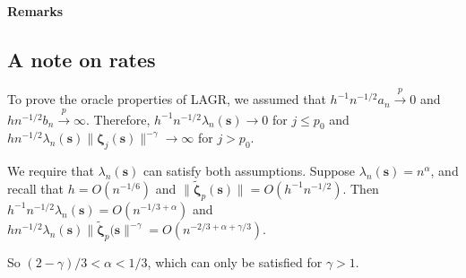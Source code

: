 \documentclass[authoryear, review, 11pt]{elsarticle}
\begin{document}
        \paragraph{Remarks}

        \subsection{A note on rates}
        To prove the oracle properties of LAGR, we assumed that $h^{-1} n^{-1/2} a_n \xrightarrow{p} 0$ and $h n^{-1/2} b_n \xrightarrow{p} \infty$. Therefore, $h^{-1} n^{-1/2} \lambda_n(\bm{s})  \to 0$ for $j \le p_0$ and $h n^{-1/2} \lambda_n(\bm{s}) \| \bm{\zeta}_j(\bm{s}) \|^{-\gamma} \to \infty$ for $j > p_0$.
        
        We require that $\lambda_n(\bm{s})$ can satisfy both assumptions. Suppose $\lambda_n(\bm{s}) = n^{\alpha}$, and recall that $h = O(n^{-1/6})$ and $ \| \tilde{\bm{\zeta}}_p(\bm{s}) \| = O(h^{-1} n^{-1/2})$. Then $h^{-1} n^{-1/2} \lambda_n(\bm{s}) = O(n^{-1/3 + \alpha})$ and $h n^{-1/2} \lambda_n(\bm{s})  \| \tilde{\bm{\zeta}}_p(\bm{s} \|^{-\gamma} = O(n^{-2/3 + \alpha + \gamma/3})$.
        
        So $ (2 - \gamma)/3 < \alpha < 1/3 $, which can only be satisfied for $\gamma > 1$.

\appendix
\end{document}
